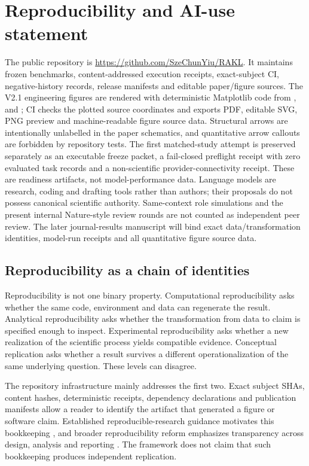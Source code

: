 \section*{Reproducibility and AI-use statement}
The public repository is \url{https://github.com/SzeChunYiu/RAKL}. It maintains frozen benchmarks, content-addressed execution receipts, exact-subject CI, negative-history records, release manifests and editable paper/figure sources. The V2.1 engineering figures are rendered with deterministic Matplotlib code from ,  and ; CI checks the plotted source coordinates and exports PDF, editable SVG, PNG preview and machine-readable figure source data. Structural arrows are intentionally unlabelled in the paper schematics, and quantitative arrow callouts are forbidden by repository tests. The first matched-study attempt is preserved separately as an executable freeze packet, a fail-closed preflight receipt with zero evaluated task records and a non-scientific provider-connectivity receipt. These are readiness artifacts, not model-performance data. Language models are research, coding and drafting tools rather than authors; their proposals do not possess canonical scientific authority. Same-context role simulations and the present internal Nature-style review rounds are not counted as independent peer review. The later journal-results manuscript will bind exact data/transformation identities, model-run receipts and all quantitative figure source data.

\appendix
\subsection{Reproducibility as a chain of identities}

Reproducibility is not one binary property. Computational reproducibility asks whether the same code, environment and data can regenerate the result. Analytical reproducibility asks whether the transformation from data to claim is specified enough to inspect. Experimental reproducibility asks whether a new realization of the scientific process yields compatible evidence. Conceptual replication asks whether a result survives a different operationalization of the same underlying question. These levels can disagree.

The repository infrastructure mainly addresses the first two. Exact subject SHAs, content hashes, deterministic receipts, dependency declarations and publication manifests allow a reader to identify the artifact that generated a figure or software claim. Established reproducible-research guidance motivates this bookkeeping \cite{sandve2013,wilson2017}, and broader reproducibility reform emphasizes transparency across design, analysis and reporting \cite{munafo2017}. The framework does not claim that such bookkeeping produces independent replication.

